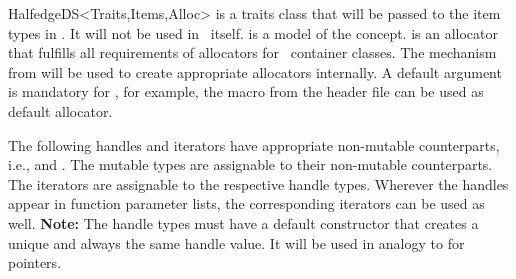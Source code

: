 \begin{ccRefConcept}{HalfedgeDS<Traits,Items,Alloc>}
 is a traits class that will be passed to the 
item types in . It will not be used in \ccRefName\
itself.  is a model of the  concept.
\ccc{Alloc} is an allocator that fulfills all requirements 
of allocators for \stl\ container classes. The  
mechanism from  will be used to create appropriate 
allocators internally. A default argument is mandatory for
\ccc{Alloc}, for example, the macro 
from the  header file can be used as default
allocator.

\ccTypes


\ccGlue
{}

\ccGlue
{}
\ccGlue
{}
\ccGlue
{}


\ccGlue
{}
\ccGlue
{}

The following handles and iterators have appropriate non-mutable
counterparts, i.e., \ccc{const_handle} and \ccc{const_iterator}. The
mutable types are assignable to their non-mutable counterparts. The
iterators are assignable to the respective handle types. Wherever the
handles appear in function parameter lists, the corresponding
iterators can be used as well. {\bf Note:} The handle types must have
a default constructor that creates a unique and always the same handle
value. It will be used in analogy to \ccc{NULL} for pointers.

\ccGlue
{}
\ccGlue
{}

\ccGlue
{}
\ccGlue
{}

\begin{ccAdvanced}


\end{ccAdvanced}
\end{ccRefConcept}
